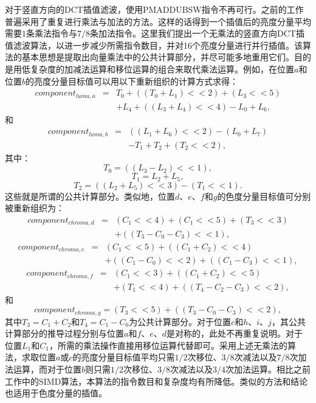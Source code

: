 对于竖直方向的DCT插值滤波，使用PMADDUBSW指令不再可行。之前的工作普遍采用了重复进行乘法与加法的方法。这样的话得到一个插值后的亮度分量平均需要$1$条乘法指令与$7/8$条加法指令。这里我们提出一个无乘法的竖直方向DCT插值滤波算法，以进一步减少所需指令数目，并对16个亮度分量进行并行插值。该算法的基本思想是提取出向量乘法中的公共计算部分，并尽可能多地重用它们。目的是用低复杂度的加减法运算和移位运算的组合来取代乘法运算。例如，在位置$a$和位置$b$的亮度分量目标值可以用以下重新组织的计算方式求得：
\begin{eqnarray}
component_{luma,a} &=& T_0 + ((T_0+L_1)<<2) + (L_3<<5)
\nonumber 
\\&& + L_4 + ((L_3+L_4)<<4)- L_0 + L_6,
\end{eqnarray}
和
\begin{eqnarray}
component_{luma,b} &=& ((L_1+L_6)<<2) - (L_0+L_7)
\nonumber 
\\&& - T_1 + T_2 + (T_2<<2),
\end{eqnarray}
其中：
\begin{equation}
T_0 = ((L_3 - L_2)<<1),
\end{equation}
\begin{equation}
T_1 = L_2 + L_5,
\end{equation}
\begin{equation}
T_2 = ((L_2 + L_5)<<3) - (T_1<<1).
\end{equation}
这些就是所谓的公共计算部分。类似地，位置$d$、$e$、$f$和$g$的色度分量目标值可分别被重新组织为：
\begin{eqnarray}
component_{chroma,d} &=& (C_1<<4) + (C_1<<5) + (T_3<<3)
\nonumber 
\\&& + ((T_3 - C_0 - C_3)<<1),
\end{eqnarray}
\begin{eqnarray}
component_{chroma,e} &=& (C_1<<5) + ((C_1+C_2)<<4) 
\nonumber 
\\&& + ((C_1-C_0)<<2) + ((C_1-C_3)<<1),
\end{eqnarray}
\begin{eqnarray}
component_{chroma,f} &=& (C_1<<3) + ((C_1+C_2)<<5) 
\nonumber 
\\&& + (T_1<<4) + ((T_4-C_2-C_3)<<2),
\end{eqnarray}
和
\begin{equation}
component_{chroma,g} = (T_3<<5) + ((T_3-C_0-C_3)<<2), 
\end{equation}
其中$T_3 = C_1 + C_2$和$T_4 = C_1 - C_0$为公共计算部分。对于位置$c$和$h$、$i$、$j$，其公共计算部分的推导过程分别与位置$a$和$f$、$e$、$d$是对称的，此处不再重复说明。对于位置$L_1$和$C_1$，所需的乘法操作直接用移位运算代替即可。采用上述无乘法的算法，求取位置$a$或$c$的亮度分量目标值平均只需$1/2$次移位、$3/8$次减法以及$7/8$次加法运算，而对于位置$b$则只需$1/2$次移位、$3/8$次减法以及$3/4$次加法运算。相比之前工作中的SIMD算法，本算法的指令数目和复杂度均有所降低。类似的方法和结论也适用于色度分量的插值。

